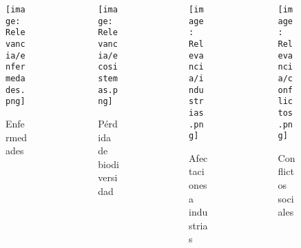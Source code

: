 \begin{frame}
    \begin{columns}
        \begin{column}{0.25\textwidth}
            \centering
            \begin{figure}
                \centering
                \texttt{[image: Relevancia/enfermedades.png]}
                \caption{Enfermedades}
            \end{figure}
        \end{column}			
        \begin{column}{0.25\textwidth}
            \centering
            \begin{figure}
                \centering
                \texttt{[image: Relevancia/ecosistemas.png]}
                \caption{Pérdida de biodiversidad}
            \end{figure}
        \end{column}
        \begin{column}{0.25\textwidth}
            \centering
            \begin{figure}
                \centering
                \texttt{[image: Relevancia/industrias.png]}
                \caption{Afectaciones a industrias}
            \end{figure}
        \end{column}
        \begin{column}{0.25\textwidth}
            \centering
            \begin{figure}
                \centering
                \texttt{[image: Relevancia/conflictos.png]}
                \caption{Conflictos sociales}
            \end{figure}
        \end{column}
    \end{columns}
\end{frame}

